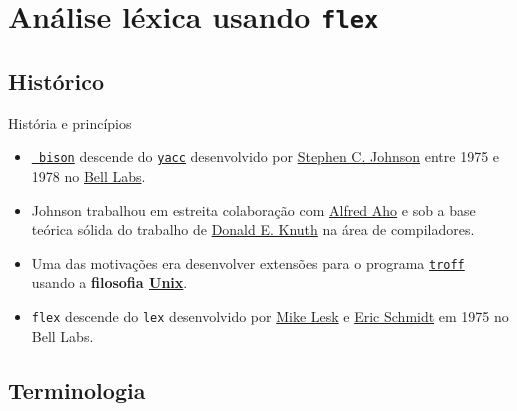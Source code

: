 \frame{\title{\insertlecture}\maketitle}

\section{Análise léxica usando {\tt flex}}

\frame{\tableofcontents}

\subsection{Histórico}

\begin{frame}{História e princípios}
  \begin{itemize}[<+->]
  \item{\color{gray!70!black}\href{https://www.gnu.org/software/bison/}{\tt
      bison} descende do
    \href{(https://pt.wikipedia.org/wiki/Yacc}{\tt yacc} desenvolvido
    por
    \href{https://en.wikipedia.org/wiki/Stephen_C._Johnson}{Stephen
      C. Johnson} entre 1975 e 1978 no
    \href{https://pt.wikipedia.org/wiki/Bell_Labs}{Bell Labs}.}
  \item Johnson trabalhou em estreita colaboração com
    \href{https://en.wikipedia.org/wiki/Alfred_Aho}{Alfred Aho}
    e sob a base teórica sólida do trabalho de
    \href{https://www-cs-faculty.stanford.edu/~knuth/}{Donald E. Knuth}
    na área de compiladores.
  \item Uma das motivações era desenvolver extensões para o
    programa \href{https://en.wikipedia.org/wiki/Troff}{\tt troff}
    usando a {\bf filosofia
    \href{https://en.wikipedia.org/wiki/Unix_philosophy}{Unix}}.
  \item \alert{\tt flex} descende do \alert{\tt lex} desenvolvido por
    \href{https://en.wikipedia.org/wiki/Mike_Lesk}{Mike Lesk}
    e \href{https://en.wikipedia.org/wiki/Eric_Schmidt}{Eric Schmidt}
    em 1975 no Bell Labs.
  \end{itemize}
\end{frame}

\subsection{Terminologia}

